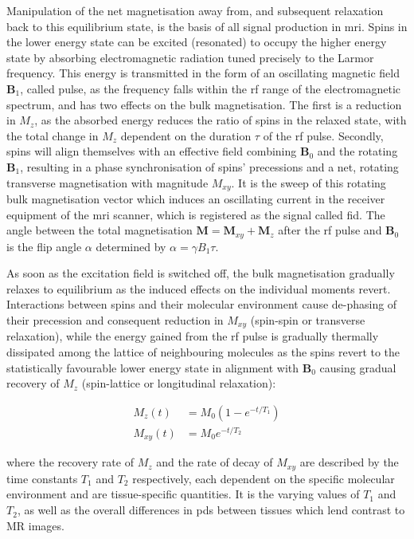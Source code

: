 Manipulation of the net magnetisation away from, and subsequent relaxation back to this equilibrium state, is the basis of all signal production in \gls{mri}.
Spins in the lower energy state can be excited (resonated) to occupy the higher energy state by absorbing electromagnetic radiation tuned precisely to the Larmor frequency.
This energy is transmitted in the form of an oscillating magnetic field $\mathbf{B}_1$, called  pulse, as the frequency falls within the \gls{rf} range of the electromagnetic spectrum, and has two effects on the bulk magnetisation.
The first is a reduction in $M_z$, as the absorbed energy reduces the ratio of spins in the relaxed state, with the total change in $M_z$ dependent on the duration $\tau$ of the \gls{rf} pulse.
Secondly, spins will align themselves with an effective field combining $\mathbf{B}_0$ and the rotating $\mathbf{B}_1$, resulting in a phase synchronisation of spins' precessions and a net, rotating transverse magnetisation with magnitude $M_{xy}$.
It is the sweep of this rotating bulk magnetisation vector which induces an oscillating current in the receiver equipment of the \gls{mri} scanner, which is registered as the signal called \gls{fid}.
The angle between the total magnetisation $\mathbf{M} = \mathbf{M}_{xy} + \mathbf{M}_{z}$ after the \gls{rf} pulse and $\mathbf{B}_0$ is the flip angle $\alpha$ determined by $\alpha = \gamma B_1 \tau$.

As soon as the excitation field is switched off, the bulk magnetisation gradually relaxes to equilibrium as the induced effects on the individual moments revert.
Interactions between spins and their molecular environment cause de-phasing of their precession and consequent reduction in $M_{xy}$ (spin-spin or transverse relaxation), while the energy gained from the \gls{rf} pulse is gradually thermally dissipated among the lattice of neighbouring molecules as the spins revert to the statistically favourable lower energy state in alignment with $\mathbf{B}_0$ causing gradual recovery of $M_z$ (spin-lattice or longitudinal relaxation):

\begin{align}
  M_z(t)  &= M_0 (1-e^{-t/T_1}) \\
  M_{xy}(t) &= M_0 e^{-t/T_2} \label{eq:recovery}
\end{align}

where the recovery rate of $M_z$ and the rate of decay of $M_{xy}$ are described by the time constants $T_1$ and $T_2$ respectively, each dependent on the specific molecular environment and are tissue-specific quantities.
It is the varying values of $T_1$ and $T_2$, as well as the overall differences in \glspl{pd} between tissues which lend contrast to MR images.


